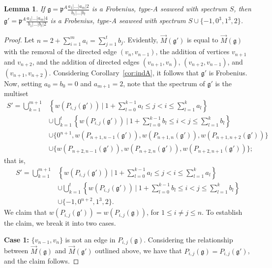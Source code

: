 \documentclass[letterpaper,10pt]{article}
\newtheorem{lemma}[theorem]{Lemma}
\begin{document}
\begin{lemma}\label{lem:add4s}
If $\mathfrak{g}=\mathfrak{p}^A\frac{a_1|\hdots|a_m|2}{b_1|\hdots|b_t}$ is a Frobenius, type-A seaweed with spectrum $S$, then $\mathfrak{g}'=\mathfrak{p}^A\frac{a_1|\hdots|a_m|4}{b_1|\hdots|b_t|2}$ is a Frobenius, type-A seaweed with spectrum $S\cup\{-1,0^3,1^3,2\}$.
\end{lemma}
\begin{proof}
Let $n=2+\sum_{i=1}^ma_i=\sum_{j=1}^tb_j$. Evidently, $\overrightarrow{M}(\mathfrak{g}')$ is equal to $\overrightarrow{M}(\mathfrak{g})$ with the removal of the directed edge $(v_{n},v_{n-1})$, the addition of vertices $v_{n+1}$ and $v_{n+2}$, and the addition of directed edges $(v_{n+1},v_n)$, $(v_{n+2},v_{n-1})$, and $(v_{n+1},v_{n+2})$. Considering Corollary~\ref{cor:indA}, it follows that $\mathfrak{g}'$ is Frobenius. Now, setting $a_0=b_0=0$ and $a_{m+1}=2$, note that the spectrum of $\mathfrak{g}'$ is the multiset
\begin{align*}
    S'=\bigcup_{k=1}^{m+1}&\left\{w(P_{i,j}(\mathfrak{g}'))~|~1+\sum_{l=0}^{k-1}a_{l}\le j< i\le \sum_{l=1}^ka_l\right\} \\
    &\cup \bigcup_{k=1}^t\left\{w(P_{i,j}(\mathfrak{g}'))~|~1+\sum_{l=0}^{k-1}b_{l}\le i< j\le \sum_{l=1}^kb_l\right\} \\
    &\cup\{0^{n+1},w(P_{n+1,n-1}(\mathfrak{g}')),w(P_{n+1,n}(\mathfrak{g}')),w(P_{n+1,n+2}(\mathfrak{g}'))\}\\
    &\cup\{w(P_{n+2,n-1}(\mathfrak{g}')),w(P_{n+2,n}(\mathfrak{g}')),w(P_{n+2,n+1}(\mathfrak{g}'))\};
\end{align*}
that is, 
\begin{align*}
    S'=\bigcup_{k=1}^{m+1}&\left\{w(P_{i,j}(\mathfrak{g}'))~|~1+\sum_{l=0}^{k-1}a_{l}\le j< i\le \sum_{l=1}^ka_l\right\} \\
    &\cup \bigcup_{k=1}^t\left\{w(P_{i,j}(\mathfrak{g}'))~|~1+\sum_{l=0}^{k-1}b_{l}\le i< j\le \sum_{l=1}^kb_l\right\} \\
    &\cup\{-1,0^{n+2},1^3,2\}.
\end{align*}
We claim that $w(P_{i,j}(\mathfrak{g}'))=w(P_{i,j}(\mathfrak{g}))$, for $1\le i\neq j\le n$. To establish the claim, we break it into two cases.
\bigskip

\noindent
\textbf{Case 1:} $\{v_{n-1},v_n\}$ is not an edge in $P_{i,j}(\mathfrak{g})$. Considering the relationship between $\overrightarrow{M}(\mathfrak{g})$ and $\overrightarrow{M}(\mathfrak{g}')$ outlined above, we have that $P_{i,j}(\mathfrak{g})=P_{i,j}(\mathfrak{g}')$, and the claim follows. 
\bigskip


\end{proof}
\end{document}

